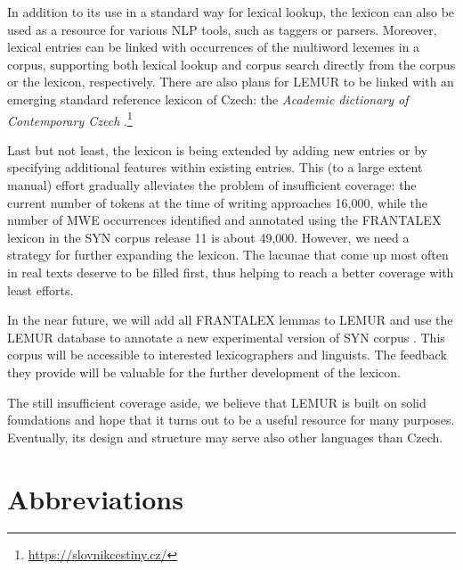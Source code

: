 \documentclass[output=paper,colorlinks,citecolor=brown]{langscibook}
\begin{document}
In addition to its use in a standard way for lexical lookup, the lexicon can also be used as a resource for various NLP tools, such as taggers or parsers. Moreover, lexical entries can be linked with occurrences of the multiword lexemes in a corpus, supporting both lexical lookup and corpus search directly from the corpus or the lexicon, respectively. 
There are also plans for LEMUR to be linked with an emerging standard reference lexicon of Czech: the \textit{Academic dictionary of Contemporary Czech} \citep{Kochova:Opavska:2016a,Kochova:Opavska:2016}.\footnote{\url{https://slovnikcestiny.cz/}}

Last but not least, the lexicon is being extended by adding new entries or by specifying additional features within existing entries. This (to a large extent manual) effort gradually alleviates the problem of insufficient coverage: the current number of tokens at the time of writing approaches 16,000, while the number of MWE occurrences identified and annotated using the FRANTALEX lexicon in the SYN corpus release 11 is about 49,000. However, we need a strategy for further expanding the lexicon. The lacunae that come up most often in real texts deserve to be filled first, thus helping to reach a better coverage with least efforts.

In the near future, we will add all FRANTALEX lemmas to LEMUR and use the LEMUR database to annotate a new experimental version of SYN corpus \citep{Hnatkova:etal:2014}. This corpus will be accessible to interested lexicographers and linguists. The feedback they provide will be valuable for the further development of the lexicon. 

The still insufficient coverage aside, we believe that LEMUR is built on solid foundations and hope that it turns out to be a useful resource for many purposes. Eventually, its design and structure may serve also other languages than Czech. 


\section*{Abbreviations}
\end{document}
